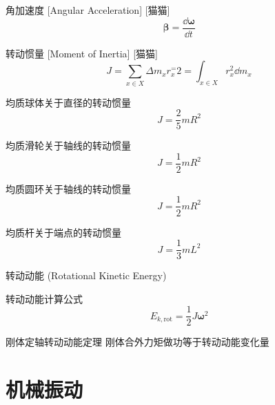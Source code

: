\documentclass[UTF8]{ctexart}
\begin{document}
            \begin{dfn}
                []
                {角加速度}
                [Angular Acceleration]
                [猫猫]
                \[\bm{\beta}=\frac{\dd\bm{\omega}}{\dd t}\]
            \end{dfn}
            
            \begin{dfn}
                []
                {转动惯量}
                [Moment of Inertia]
                [猫猫]
                \[J=\sum_{x\in X}\Delta m_x r_x^=2=\int_{x\in X}r_x^2\dd m_x\]
            \end{dfn}
            
            \begin{xmp}
                {均质球体关于直径的转动惯量}
                \[J=\frac{2}{5}mR^2\]
            \end{xmp}
            
            \begin{xmp}
                {均质滑轮关于轴线的转动惯量}
                \[J=\frac{1}{2}mR^2\]
            \end{xmp}
            
            \begin{xmp}
                {均质圆环关于轴线的转动惯量}
                \[J=\frac{1}{2}mR^2\]
            \end{xmp}
            
            \begin{xmp}
                {均质杆关于端点的转动惯量}
                \[J=\frac{1}{3}mL^2\]
            \end{xmp}
            
            \begin{dfn}
                {转动动能 (Rotational Kinetic Energy)}
            \end{dfn}
            
            \begin{thm}
                {转动动能计算公式}
                \[E_{k,\text{rot}}=\frac{1}{2}J\bm{\omega}^2\]
            \end{thm}
            
            \begin{thm}
                {刚体定轴转动动能定理}
                刚体合外力矩做功等于转动动能变化量
            \end{thm}

    \section{机械振动}
\end{document}
